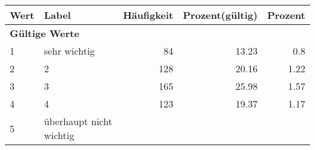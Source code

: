      \begin{longtable}{lXrrr}
     \toprule
     \textbf{Wert} & \textbf{Label} & \textbf{Häufigkeit} & \textbf{Prozent(gültig)} & \textbf{Prozent} \\
     \endhead
     \midrule
     \multicolumn{5}{l}{\textbf{Gültige Werte}}\\

     1 &
     \multicolumn{1}{X}{ sehr wichtig   } &


       \num{84} &
       \num[round-mode=places,round-precision=2]{13.23} &
         \num[round-mode=places,round-precision=2]{0.8} \\

     2 &
     \multicolumn{1}{X}{ 2   } &


       \num{128} &
       \num[round-mode=places,round-precision=2]{20.16} &
         \num[round-mode=places,round-precision=2]{1.22} \\

     3 &
     \multicolumn{1}{X}{ 3   } &


       \num{165} &
       \num[round-mode=places,round-precision=2]{25.98} &
         \num[round-mode=places,round-precision=2]{1.57} \\

     4 &
     \multicolumn{1}{X}{ 4   } &


       \num{123} &
       \num[round-mode=places,round-precision=2]{19.37} &
         \num[round-mode=places,round-precision=2]{1.17} \\

     5 &
     \multicolumn{1}{X}{ überhaupt nicht wichtig   } &



\end{longtable}
